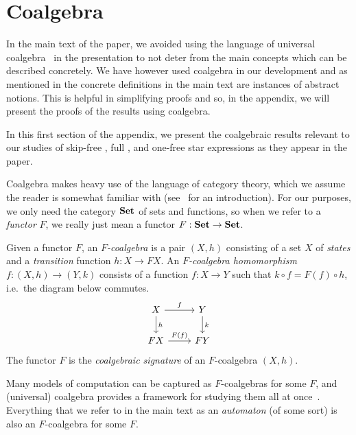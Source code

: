 \documentclass[orivec,envcountsect,envcountsame]{llncs}
\begin{document}



\ifarxiv%
\clearpage

\appendix
\allowdisplaybreaks%

\section{Coalgebra}%
\label{appendices}%
\label{app:coalgebra}

In the main text of the paper, we avoided using the language of universal coalgebra~\cite{coalgebra} in the presentation to not deter from the main concepts which can be described concretely. We have however used coalgebra in our development and as mentioned in  the concrete definitions in the main text are instances of abstract notions. This is helpful in simplifying proofs and so, in the appendix, we will present the proofs of the results using coalgebra.

In this first section of the appendix, we present the coalgebraic results relevant to our studies of skip-free \GKAT, full \GKAT, and one-free star expressions as they appear in the paper.

Coalgebra makes heavy use of the language of category theory, which we assume the reader is somewhat familiar with (see~\cite{awodey} for an introduction).
For our purposes, we only need the category \(\mathbf{Set}\) of sets and functions, so when we refer to a \emph{functor} \(F\), we really just mean a functor \(F : \mathbf{Set} \to \mathbf{Set}\).

\begin{definition}
	Given a functor \(F\), an \emph{\(F\)-coalgebra} is a pair \((X, h)\) consisting of a set \(X\) of \emph{states} and a \emph{transition} function \(h : X \to FX\).
	An \emph{\(F\)-coalgebra homomorphism} \(f : (X, h) \to (Y, k)\) consists of a function \(f : X \to Y\) such that \(k \circ f = F(f) \circ h\), i.e.\ the diagram below commutes.
	\[\begin{tikzcd}
		X \ar[r, "f"] \ar[d, "h"] & Y \ar[d, "k"] \\
		FX \ar[r, "F(f)"] & FY
	\end{tikzcd}
	\]
	The functor \(F\) is the \emph{coalgebraic signature} of an \(F\)-coalgebra \((X, h)\).
\end{definition}


Many models of computation can be captured as \(F\)-coalgebras for some \(F\), and (universal) coalgebra provides a framework for studying them all at once~\cite{coalgebra}.
Everything that we refer to in the main text as an \emph{automaton} (of some sort) is also an \(F\)-coalgebra for some \(F\).
\end{document}
